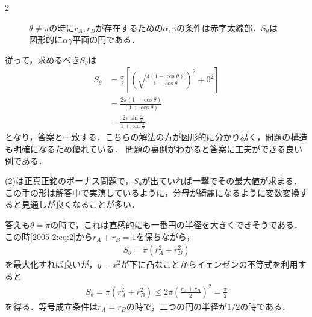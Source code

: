 \documentclass[../../main.tex]{subfiles}
\begin{document}
\begin{multicols}{2}
\begin{figure}[H]
    \caption{$\theta\neq \pi$の時に$r_A,r_B$が存在するための$\alpha,\gamma$の条件は赤字太線部．$S_{\theta}$は図形的に$\alpha\gamma$平面の円である．}
    \label{2005-2:fig:4}
  \end{figure}

  従って，求めるべき$S_{\theta}$は
  \begin{align*}
    S_{\theta}
     & = \frac{\pi}{2}\left[\left(\sqrt{\frac{4(1-\cos\theta)}{1+\cos\theta}}\right)^2+0^2\right] \\
     & = \frac{2\pi(1-\cos\theta)}{(1+\cos\theta)}                                                \\
     & = \frac{2\pi\sin\frac{\pi}{2}}{1+\sin\frac{\pi}{2}}
  \end{align*}
  となり，答案と一致する．こちらの解法の方が図形的に分かり易く，問題の構造も明確になるため優れている．
  問題の裏側がわかると答案に工夫ができる良い例である．

  \vspace{10pt}
  (2)は正真正銘のボーナス問題で，$S_{\theta}$が出ていれば一撃でその最大値が求まる．
  この手の形は解答中で実演しているように，分母が綺麗になるように変数変換すると見通しが良くなることが多い．

  答えも$\theta=\pi$の時で，これは直感的にも一番円の半径を大きくできそうである．
  この時\cref{2005-2:eq:2}から$r_A+r_B=1$を保ちながら，
  \begin{align*}
    S_{\theta} = \pi\left(r_A^2+r_B^2\right)
  \end{align*}
  を最大化すれば良いが，$y=x^2$が下に凸なことからイェンゼンの不等式を利用すると
  \begin{align*}
    S_{\theta} = \pi\left(r_A^2+r_B^2\right) \le 2\pi \left(\frac{r_A+r_B}{2}\right)^2 = \frac{\pi}{2}
  \end{align*}
  を得る．等号成立条件は$r_A=r_B$の時で，二つの円の半径が$1/2$の時である．

  \newpage
\end{multicols}
\end{document}
